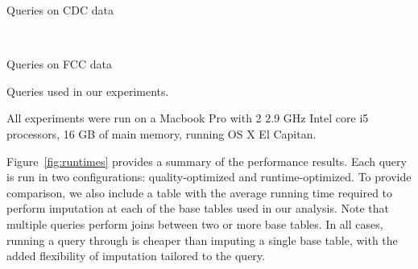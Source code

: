 \begin{table}
\centering
 \begin{subtable}{\linewidth}
  
  \caption{Queries on CDC data}
  \label{fig:queries-cdc}
 \end{subtable}
 ~
 \begin{subtable}{\linewidth}
 
 \caption{Queries on FCC data}
 \label{fig:queries-fcc}
 \end{subtable}
  \caption{Queries used in our experiments.}
  \label{fig:queries}
\end{table}

%  

All experiments were run on a Macbook Pro with 2 2.9 GHz Intel core i5 processors, 16 GB of main memory,  running OS X El Capitan.

Figure~\ref{fig:runtimes} provides a summary of the performance results. Each query is run in two configurations: quality-optimized and runtime-optimized.
To provide comparison, we also include a table with the average running time required to perform imputation at each of the base tables used in our analysis.
Note that multiple queries perform joins between two or more base tables. In all cases, running a query through \ProjectName{} is cheaper than 
imputing a single base table, with the added flexibility of imputation tailored to the query.


